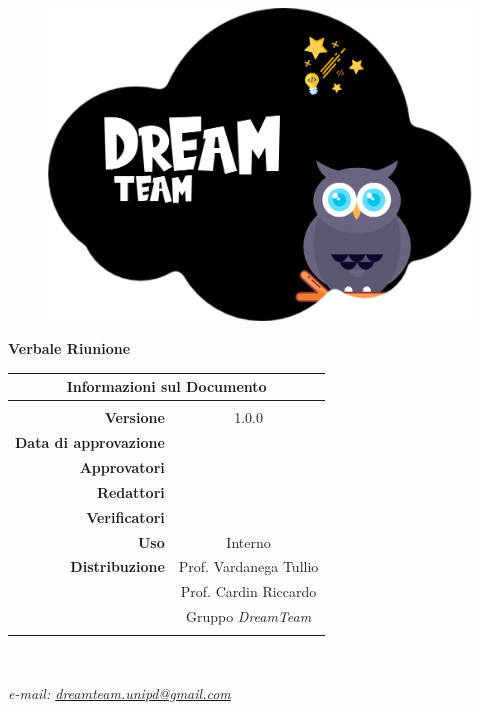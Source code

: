 \begin{center}

	\begin{figure}
		\centering
		\includegraphics[scale=0.05]{Sezioni/images/DreamTeam.png}
	\end{figure}

	{\Huge{\textbf{Verbale Riunione \D}}} \\ [1cm]

	\begin{table}[htbp]
		\centering
		\begin{tabular}{r|c}
			\multicolumn{2}{c}{\textbf{Informazioni sul Documento}}   \\
			\hline                                                    \\
			\textbf{Versione}             & 1.0.0                     \\ \rule{0pt}{3ex}
			\textbf{Data di approvazione} &                           \\ \rule{0pt}{3ex}
			\textbf{Approvatori}          &                           \\ \rule{0pt}{3ex}
			\textbf{Redattori}            & \PV                       \\ \rule{0pt}{3ex}
			\textbf{Verificatori}         &                           \\ \rule{0pt}{3ex}
			\textbf{Uso}                  & Interno                   \\ \rule{0pt}{3ex}
			\textbf{Distribuzione}        & Prof. Vardanega Tullio    \\ \rule{0pt}{2ex}
			                              & Prof. Cardin Riccardo     \\ \rule{0pt}{2ex}
			                              & Gruppo \textit{DreamTeam} \\ \rule{0pt}{0.1cm}
		\end{tabular} \\ [0.5cm]
	\end{table}

	\textsl{ e-mail: \href{mailto:dreamteam.unipd@gmail.com}{dreamteam.unipd@gmail.com} } \\[2cm]
\end{center}
\pagebreak